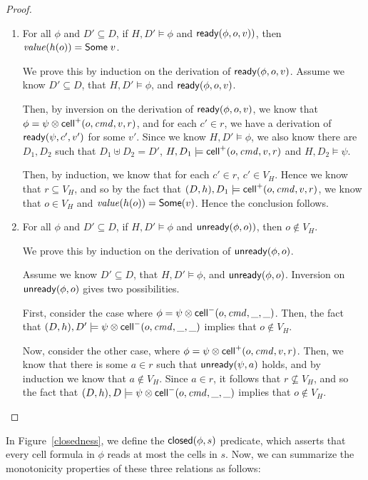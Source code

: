 \begin{proof}
\begin{enumerate}
\item For all $\phi$ and $D' \subseteq D$, if $H, D' \models \phi$ and $\mathsf{ready}({\phi}, {o}, {v}))$, then $\mathit{value}(h(o)) = \mathsf{Some}\;v$.

We prove this by induction on the derivation of
$\mathsf{ready}({\phi}, {o}, {v})$. Assume we know $D' \subseteq D$, that 
$H, D' \models \phi$, and $\mathsf{ready}({\phi}, {o}, {v})$. 

Then, by inversion on the derivation of $\mathsf{ready}({\phi}, {o}, {v})$, we know
that $\phi = \psi \otimes \mathsf{cell}^{+}({o}, {\mathit{cmd}}, {v}, {r})$, and for each $c'
\in r$, we have a derivation of $\mathsf{ready}({\psi}, {c'}, {v'})$ for some
$v'$. Since we know $H, D' \models \phi$, we also know there are $D_1,
D_2$ such that $D_1 \uplus D_2 = D'$, $H, D_1 \models
\mathsf{cell}^{+}({o}, {\mathit{cmd}}, {v}, {r})$ and $H, D_2 \models \psi$.

Then, by induction, we know that for each $c' \in r$, $c' \in V_H$. Hence
we know that $r \subseteq V_H$, and so by
the fact that $(D,h), D_1 \models \mathsf{cell}^{+}({o}, {\mathit{cmd}}, {v}, {r})$,
we know that $o \in V_H$ and $\mathit{value}(h(o)) =
\mathsf{Some}(v)$. Hence the conclusion follows.

\item For all $\phi$ and $D' \subseteq D$, if $H, D' \models \phi$ and $\mathsf{unready}({\phi}, {o}))$, then $o \not\in V_H$.

We prove this by induction on the derivation of $\mathsf{unready}({\phi}, {o})$.

Assume we know $D' \subseteq D$, that $H, D' \models \phi$, and
$\mathsf{unready}({\phi}, {o})$. Inversion on $\mathsf{unready}({\phi}, {o})$ gives two
possibilities.

First, consider the case where $\phi = \psi \otimes \mathsf{cell}^{-}({o}, {\mathit{cmd}}, {\_}, {\_})$. 
Then, the fact that $(D,h), D' \models \psi \otimes \mathsf{cell}^{-}({o}, {\mathit{cmd}}, {\_}, {\_})$
implies that $o \not\in V_H$. 

Now, consider the other case, where $\phi = \psi \otimes
\mathsf{cell}^{+}({o}, {\mathit{cmd}}, {v}, {r})$. Then, we know that there is some $a \in r$
such that $\mathsf{unready}({\psi}, {a})$ holds, and by induction we know that $a
\not\in V_H$. Since $a \in r$, it follows that $r \not\subseteq V_H$, and so the
fact that $(D,h), D \models \psi \otimes \mathsf{cell}^{-}({o}, {\mathit{cmd}}, {\_}, {\_})$ implies
that $o \not\in V_H$.
\end{enumerate}
\end{proof}

In Figure~\ref{closedness}, we define the $\mathsf{closed}({\phi}, {s})$
predicate, which asserts that every cell formula in $\phi$ reads at
most the cells in $s$. Now, we can summarize the monotonicity properties
of these three relations as follows:

